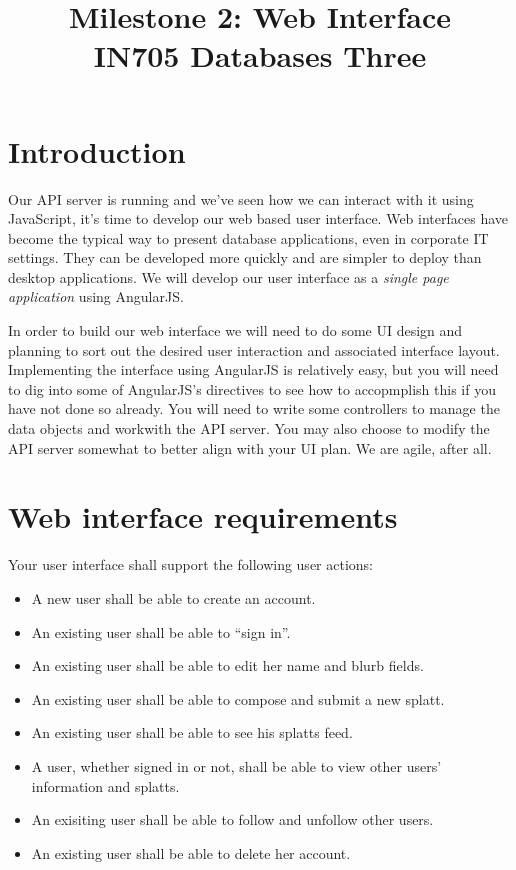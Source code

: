 \documentclass{article}
\begin{document}
\title{Milestone 2: Web Interface\\ IN705 Databases Three}
\date{}
\maketitle

\section*{Introduction}
Our API server is running and we've seen how we can interact with it using JavaScript, it's time to develop our web based user interface.  Web interfaces have become the typical way to present database applications, even in corporate IT settings.  They can be developed more quickly and are simpler to deploy than desktop applications.  We will develop our user interface as a \emph{single page application} using AngularJS. 

In order to build our web interface we will need to do some UI design and planning to sort out the desired user interaction and associated interface layout.  Implementing the interface using AngularJS is relatively easy, but you will need to dig into some of AngularJS's directives to see how to accopmplish this if you have not done so already.  You will need to write some controllers to manage the data objects and workwith the API server.  You may also choose to modify the API server somewhat to better align with your UI plan.  We are agile, after all.

\section{Web interface requirements}
Your user interface shall support the following user actions:

\begin{itemize}
 \item A new user shall be able to create an account.
 \item An existing user shall be able to ``sign in''.
 \item An existing user shall be able to edit her name and blurb fields.
 \item An existing user shall be able to compose and submit a new splatt.
 \item An existing user shall be able to see his splatts feed.
 \item A user, whether signed in or not, shall be able to view other users' information and splatts.
 \item An exisiting user shall be able to follow and unfollow other users.
 \item An existing user shall be able to delete her account.
\end{itemize}
\end{document}

